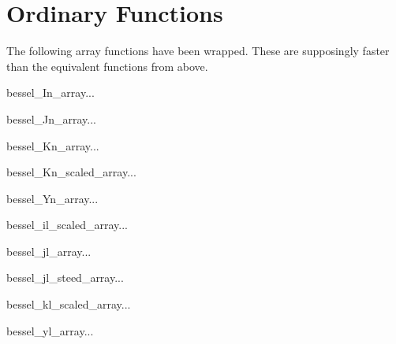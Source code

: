 \section{Ordinary Functions}

The following array functions have been wrapped. These are supposingly faster
than the equivalent functions from above.
\begin{funcdesc}{bessel_In_array}{...}
\end{funcdesc}
\begin{funcdesc}{bessel_Jn_array}{...}
\end{funcdesc}
\begin{funcdesc}{bessel_Kn_array}{...}
\end{funcdesc}
\begin{funcdesc}{bessel_Kn_scaled_array}{...}
\end{funcdesc}
\begin{funcdesc}{bessel_Yn_array}{...}
\end{funcdesc}
\begin{funcdesc}{bessel_il_scaled_array}{...}
\end{funcdesc}
\begin{funcdesc}{bessel_jl_array}{...}
\end{funcdesc}
\begin{funcdesc}{bessel_jl_steed_array}{...}
\end{funcdesc}
\begin{funcdesc}{bessel_kl_scaled_array}{...}
\end{funcdesc}
\begin{funcdesc}{bessel_yl_array}{...}
\end{funcdesc}


